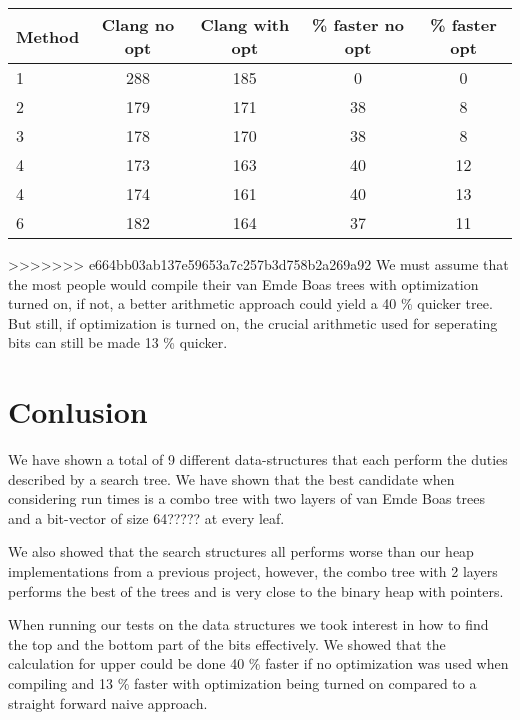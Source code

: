 \documentclass[oneside,11pt,openright]{report}
\begin{document}
\begin{center}
  \begin{tabular}{ l | c | c | c | c }
    Method & Clang no opt & Clang with opt & \% faster no opt & \% faster opt  \\ \hline
    1 & 288 & 185 & 0 & 0 \\ 
    2 & 179 & 171 & 38 & 8\\ 
    3 & 178 & 170 & 38 & 8 \\ 
    4 & 173 & 163 & 40 & 12\\ 
    4 & 174 & 161 & 40 & 13 \\ 
    6 & 182 & 164 & 37 & 11 \\ 
  \end{tabular}
\end{center}

>>>>>>> e664bb03ab137e59653a7c257b3d758b2a269a92
We must assume that the most people would compile their van Emde Boas trees with optimization turned on, if not, a better arithmetic approach could yield a 40 \% quicker tree. But still, if optimization is turned on, the crucial arithmetic used for seperating bits can still be made 13 \% quicker.

\chapter{Conlusion}

We have shown a total of 9 different data-structures that each perform the duties described by a search tree. We have shown that the best candidate when considering run times is a combo tree with two layers of van Emde Boas trees and a bit-vector of size 64????? at every leaf.

We also showed that the search structures all performs worse than our heap implementations from a previous project, however, the combo tree with 2 layers performs the best of the trees and is very close to the binary heap with pointers.

When running our tests on the data structures we took interest in how to find the top and the bottom part of the bits effectively. We showed that the calculation for upper could be done 40 \% faster if no optimization was used when compiling and 13 \% faster with optimization being turned on compared to a straight forward naive approach. 



 

\end{document}
